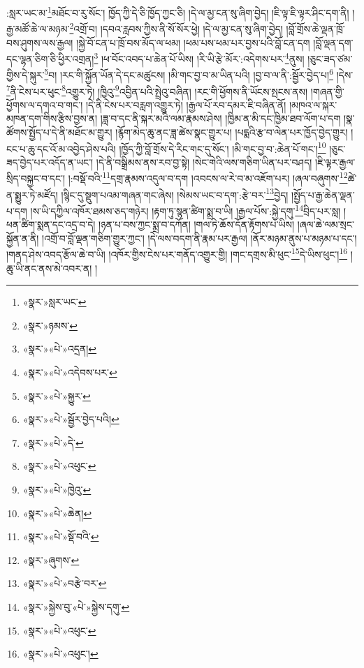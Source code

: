 :སླར་ཡང་མ་\footnote{«སྣར་»སླར་ཡང་}མཐོང་བ་རུ་སོང་། ཁྱོད་ཀྱི་དེ་ཅི་ཁྱོད་ཀྱང་ཅི། །དེ་ལ་མྱ་ངན་སུ་ཞིག་བྱེད། །ཇི་ལྟ་ཇི་ལྟར་ཤིང་དག་ནི། །རྒྱ་མཚོ་ཆེ་ལ་མཉམ་\footnote{«སྣར་»ཉམས་}འགྲོ་བ། །དབའ་རླབས་ཀྱིས་ནི་སོ་སོར་ཕྱེ། །དེ་ལ་མྱ་ངན་སུ་ཞིག་བྱེད། །བློ་གྲོས་ཆེ་ལྡན་ཁྲོ་བས་ཤུགས་ལས་རྒྱལ། །སྐྱེ་བོ་ངན་པ་ཁྲོ་བས་མོད་ལ་ཕམ། །ཕམ་པས་ཕམ་པར་བྱས་པའི་བློ་ངན་དག །བློ་ལྡན་དག་དང་ལྷན་ཅིག་ཅི་ཕྱིར་འགྲན།\footnote{«སྣར་»«པེ་»འདྲན།} །ཕ་བོང་འབད་པ་ཆེན་པོ་ཡིས། །རི་ཡི་རྩེ་མོར་:འདེགས་པར་\footnote{«སྣར་»«པེ་»འདེབས་པར་}ནུས། །ཅུང་ཟད་ཙམ་གྱིས་དེ་སྐུར་\footnote{«སྣར་»«པེ་»སྐྱུར་}བ། །རང་གི་སྐྱོན་ཡོན་དེ་དང་མཚུངས། །མི་གང་བྱ་བ་མ་ཡིན་པའི། །བྱ་བ་ལ་ནི་:སྦྱོར་བྱེད་པ།\footnote{«སྣར་»«པེ་»སྦྱོར་བྱེད་པའི།} །དེས་\footnote{«སྣར་»«པེ་»དེ་}ནི་ངེས་པར་ཕུང་\footnote{«སྣར་»«པེ་»འཕུང་}འགྱུར་ཏེ། །ཁྱིའུ་\footnote{«སྣར་»«པེ་»ཁྱེའུ་}འབྱིན་པའི་སྤྲེའུ་བཞིན། །རང་གི་ཕྱོགས་ནི་ཡོངས་སྤངས་ནས། །གཞན་གྱི་ཕྱོགས་ལ་དགའ་བ་གང་། །དེ་ནི་ངེས་པར་བརླག་འགྱུར་ཏེ། །རྒྱལ་པོ་རབ་དམར་ཇི་བཞིན་ནོ། །མཁའ་ལ་སྐར་མཁན་དག་གིས་རྩིས་བྱས་ན། །ཟླ་བ་དང་ནི་སྐར་མའི་ལམ་རྣམས་ཤེས། །ཁྱིམ་ན་མི་དང་ཁྱིམ་ཐབ་ལོག་པ་དག །སྣ་ཚོགས་སྤྱོད་པ་དེ་ནི་མཐོང་མ་གྱུར། །རྙོག་མེད་ཆུ་ནང་ཟླ་ཚེས་སྣང་གྱུར་པ། །པདྨའི་རྩ་བ་ལེན་པར་ཁྱོད་བྱེད་གྱུར། །ངང་པ་ཆུ་དང་འོ་མ་འབྱེད་ཤེས་པའི། །ཁྱོད་ཀྱི་བློ་གྲོས་དེ་རིང་གང་དུ་སོང་། །མི་གང་བྱ་བ་:ཆེན་པོ་གང་།\footnote{«སྣར་»«པེ་»ཆེན།} །ཅུང་ཟད་བྱེད་པར་འདོད་ན་ཡང་། །དེ་ནི་བསྒྲིམས་ནས་རབ་བྱ་སྟེ། །སེང་གེའི་ལས་གཅིག་ཡིན་པར་བཤད། །ཇི་ལྟར་རྒྱལ་སྲིད་བསྐྱང་བ་དང་། །:བསྡོ་བའི་\footnote{«སྣར་»«པེ་»སྡོ་བའི་}དགྲ་རྣམས་འདུལ་བ་དག །འབངས་ལ་རེ་བ་མ་འཇོག་པར། །ཞལ་བཞུགས་\footnote{«སྣར་»ཞུགས་}ཚེ་ན་སྨྱུར་ཏེ་མཛོད། །སྙིང་དུ་སྡུག་པའམ་གཞན་གང་ཞེས། །སེམས་ཡང་བ་དག་:རྩེ་བར་\footnote{«སྣར་»«པེ་»བརྩེ་བར་}བྱེད། །སྤྱོད་པ་རྒྱ་ཆེན་ལྡན་པ་དག །ས་ཡི་དཀྱིལ་འཁོར་ཐམས་ཅད་གཉེར། །རྟག་ཏུ་སྙན་ཚིག་སྨྲ་བ་ཡི། །རྒྱལ་པོས་:སྐྱེ་དགུ་\footnote{«སྣར་»སྐྱེས་བུ་«པེ་»སྐྱེས་དགུ་}བྲིད་པར་སླ། །ཕན་ཚིག་སྨན་དང་འདྲ་བ་དེ། །ཉན་པ་བས་ཀྱང་སྨྲ་བ་དཀོན། །གལ་ཏེ་ཆོས་དོན་རྟོགས་པ་ཡིས། །ཞལ་ཆེ་ལམ་སྲང་སྐྱོན་ན་ནི། །འགྲོ་བ་བློ་ལྡན་གཅིག་གྱུར་ཀྱང་། །དེ་ལས་བདག་ནི་རྣམ་པར་རྒྱལ། །ནོར་མཉམ་ནུས་པ་མཉམ་པ་དང་། །གནད་ཤེས་འབད་རྩོལ་ཆེ་བ་ཡི། །འཁོར་གྱིས་ངེས་པར་གནོད་འགྱུར་གྱི། །གང་དགྲས་མི་ཕུང་\footnote{«སྣར་»«པེ་»འཕུང་}དེ་ཡིས་ཕུང་།\footnote{«སྣར་»«པེ་»འཕུང་།} །ཆུ་ཡི་ནང་ནས་མེ་འབར་ན། །
